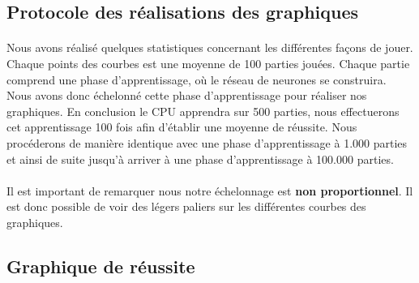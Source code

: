 \documentclass{article}
\begin{document}
  \subsection{Protocole des réalisations des graphiques}
  \paragraph{}
    Nous avons réalisé quelques statistiques concernant les différentes façons de jouer.
    Chaque points des courbes est une moyenne de 100 parties jouées. Chaque partie comprend une phase d'apprentissage,
    où le réseau de neurones se construira. Nous avons donc échelonné cette phase d'apprentissage pour réaliser nos graphiques.
    En conclusion le CPU apprendra sur 500 parties, nous effectuerons cet apprentissage 100 fois afin d'établir une moyenne de réussite.
    Nous procéderons de manière identique avec une phase d'apprentissage à 1.000 parties et ainsi de suite jusqu'à arriver à une phase d'apprentissage à 100.000 parties.
  \paragraph{}
    Il est important de remarquer nous notre échelonnage est \textbf{non proportionnel}. Il est donc possible de voir
    des légers paliers sur les différentes courbes des graphiques.
  
  \subsection{Graphique de réussite}
\end{document}
